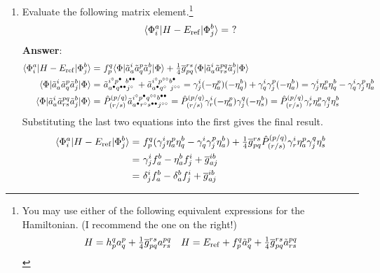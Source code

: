 \documentclass[11pt]{article}
\numberwithin{equation}{section}
\begin{document}
\begin{enumerate}
\newpage
\item
  Evaluate the following matrix element.\footnote{You may use either of the following equivalent expressions for the Hamiltonian. (I recommend the one on the right!)
  \begin{align*}
    H
  =
    h_p^q
    a^p_q
  +
    \tfrac{1}{4}
    \overline{g}_{pq}^{rs}
    a^{pq}_{rs}
  &&
    H
  =
    E_{\mathrm{ref}}
  +
    f_p^q
    \tilde{a}^p_q
  +
    \tfrac{1}{4}
    \overline{g}_{pq}^{rs}
    \tilde{a}^{pq}_{rs}
  \end{align*}
  }
  \begin{align*}
    \langle\Phi _i^a|H - E_{\mathrm{ref}}|\Phi _j^b\rangle
  =
    \,\,?
  \end{align*}
  \textbf{Answer}:
  \begin{align*}
    \ip{\F_i^a|H - E_\mr{ref}|\F_j^b}
  =&\
    f_p^q
    \ip{\F|
      \tl{a}^i_a
      \tl{a}^p_q
      \tl{a}^b_j
    |\F}
  +
    \tfr{1}{4}
    \ol{g}_{pq}^{rs}
    \ip{\F|
      \tl{a}^i_a
      \tl{a}^{pq}_{rs}
      \tl{a}^b_j
    |\F}
  \\
    \ip{\F|
      \tl{a}^i_a
      \tl{a}^p_q
      \tl{a}^b_j
    |\F}
  =&\
    \tl{a}^{i^\hole p^{\ptcl\phantom{\ptcl}} b^{\ptcl\ptcl}}
          _{a^\ptcl q^{\ptcl\ptcl} j^\hole}
  +
    \tl{a}^{i^\hole p^{\hole\hole} b^\ptcl}
          _{a^\ptcl q^{\hole\phantom{\hole}} j^{\hole\hole}}
  =
    \g^i_j
    (-\h^p_a)
    (-\h^b_q)
  +
    \g^i_q
    \g^p_j
    (-\h^b_a)
  =
    \g^i_j
    \h^p_a
    \h^b_q
  -
    \g^i_q
    \g^p_j
    \h^b_a
  \\
    \ip{\F|
      \tl{a}^i_a
      \tl{a}^{pq}_{rs}
      \tl{a}^b_j
    |\F}
  =&\
    \op{P}^{(p/q)}_{(r/s)}
    \tl{a}^{i^\hole p^\ptcl q^{\hole\hole} b^{\ptcl\ptcl}}
          _{a^\ptcl r^\hole s^{\ptcl\ptcl} j^{\hole\hole}}
  =
    \op{P}^{(p/q)}_{(r/s)}
    \g^i_r
    (-\h^p_a)
    \g^q_j
    (-\h^b_s)
  =
    \op{P}^{(p/q)}_{(r/s)}
    \g^i_r
    \h^p_a
    \g^q_j
    \h^b_s
  \end{align*}
  Substituting the last two equations into the first gives the final result.
  \begin{align*}
    \langle\Phi _i^a|H - E_{\mathrm{ref}}|\Phi _j^b\rangle
  =&\
    f_p^q
    (
      \gamma ^i_j
      \eta ^p_a
      \eta ^b_q
    -
      \gamma ^i_q
      \gamma ^p_j
      \eta ^b_a
    )
  +
    \tfrac{1}{4}
    \overline{g}_{pq}^{rs}
    \hat{P}^{(p/q)}_{(r/s)}
    \gamma ^i_r
    \eta ^p_a
    \gamma ^q_j
    \eta ^b_s
  \\=&\
    \gamma ^i_j
    f_a^b
  -
    \eta ^b_a
    f_j^i
  +
    \overline{g}_{aj}^{ib}
  \\=&\
    \delta ^i_j
    f_a^b
  -
    \delta ^b_a
    f_j^i
  +
    \overline{g}_{aj}^{ib}
  \end{align*}

\end{enumerate}
\end{document}
